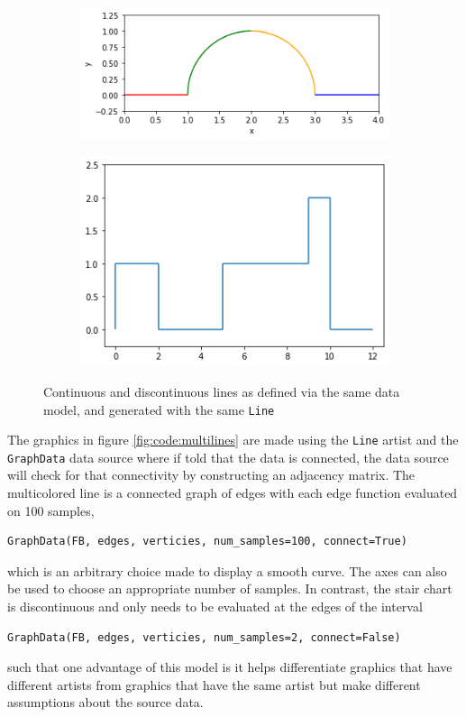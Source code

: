 \documentclass[../main.tex]{subfiles}
\begin{document}
\begin{figure}[htb]
    \begin{subfigure}{.5\textwidth}
        \includegraphics[width=\textwidth]{figures/code/linec_1.png}
    \end{subfigure}
    \begin{subfigure}{.5\textwidth}
        \includegraphics[width=\textwidth]{figures/code/lined_1.png}
    \end{subfigure}
\caption{Continuous and discontinuous lines as defined via the same data model, and generated with the same \vartisteq \texttt{Line}}
\label{fig:code:multilines}
\end{figure}
The graphics in figure \autoref{fig:code:multilines} are made using the \texttt{Line} artist and the \texttt{GraphData} data source where if told that the data is connected, the data source will check for that connectivity by constructing an adjacency matrix. The multicolored line is a connected graph of edges with each edge function evaluated on 100 samples, 
\begin{verbatim}
GraphData(FB, edges, verticies, num_samples=100, connect=True)
\end{verbatim}
which is an arbitrary choice made to display a smooth curve. The axes can also be used to choose an appropriate number of samples. In contrast, the stair chart is discontinuous and only needs to be evaluated at the edges of the interval 
\begin{verbatim}
GraphData(FB, edges, verticies, num_samples=2, connect=False)
\end{verbatim}
such that one advantage of this model is it helps differentiate graphics that have different artists from graphics that have the same artist but make different assumptions about the source data.
\end{document}
